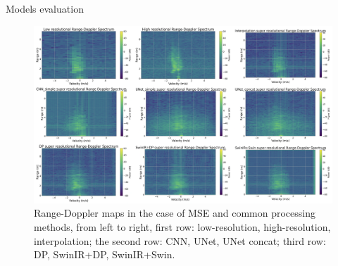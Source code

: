 \documentclass{beamer}
\begin{document}
\begin{frame}{Models evaluation}
    \begin{figure}
        \centering
        \includegraphics[scale=.3]{MA_presentation/figures/evaluation_models_1.png}
        \vspace{-0.18cm}
        \caption{Range-Doppler maps in the case of MSE and common processing methods, from left to right, first row: low-resolution, high-resolution, interpolation; the second row: CNN, UNet, UNet concat; third row: DP, SwinIR+DP, SwinIR+Swin.}
        \label{evaluation models 1}
    \end{figure}
\end{frame}


\end{document}
